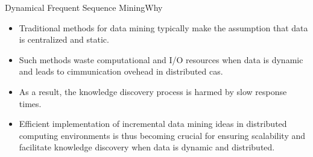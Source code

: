 \documentclass[12pt]{beamer}
\begin{document}
\begin{frame}{Dynamical Frequent Sequence Mining}{Why}
\begin{itemize}
  \item Traditional methods for data mining typically make the assumption that data is centralized and static.
  \item Such methods waste computational and I/O resources when data is dynamic and leads to cimmunication ovehead in distributed cas.
  \item As a result, the knowledge discovery process is harmed by slow response times.
  \item Efficient implementation of incremental data mining ideas in distributed computing environments is thus becoming crucial for ensuring scalability and facilitate knowledge discovery when data is dynamic and distributed.
\end{itemize}
\end{frame}
\end{document}
